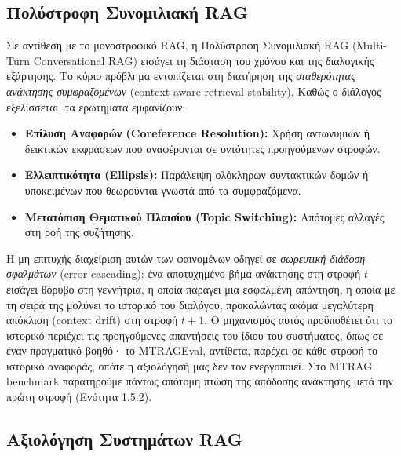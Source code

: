 \subsection{Πολύστροφη Συνομιλιακή RAG}

Σε αντίθεση με το μονοστροφικό RAG, η Πολύστροφη Συνομιλιακή RAG (Multi-Turn Conversational RAG) εισάγει τη διάσταση του χρόνου και της διαλογικής εξάρτησης. Το κύριο πρόβλημα εντοπίζεται στη διατήρηση της \textit{σταθερότητας ανάκτησης συμφραζομένων} (context-aware retrieval stability). Καθώς ο διάλογος εξελίσσεται, τα ερωτήματα εμφανίζουν:
\begin{itemize}
    \item \textbf{Επίλυση Αναφορών (Coreference Resolution):} Χρήση αντωνυμιών ή δεικτικών εκφράσεων που αναφέρονται σε οντότητες προηγούμενων στροφών.
    \item \textbf{Ελλειπτικότητα (Ellipsis):} Παράλειψη ολόκληρων συντακτικών δομών ή υποκειμένων που θεωρούνται γνωστά από τα συμφραζόμενα.
    \item \textbf{Μετατόπιση Θεματικού Πλαισίου (Topic Switching):} Απότομες αλλαγές στη ροή της συζήτησης.
\end{itemize}

Η μη επιτυχής διαχείριση αυτών των φαινομένων οδηγεί σε \textit{σωρευτική διάδοση σφαλμάτων} (error cascading): ένα αποτυχημένο βήμα ανάκτησης στη στροφή $t$ εισάγει θόρυβο στη γεννήτρια, η οποία παράγει μια εσφαλμένη απάντηση, η οποία με τη σειρά της μολύνει το ιστορικό του διαλόγου, προκαλώντας ακόμα μεγαλύτερη απόκλιση (context drift) στη στροφή $t+1$. Ο μηχανισμός αυτός προϋποθέτει ότι το ιστορικό περιέχει τις προηγούμενες απαντήσεις του ίδιου του συστήματος, όπως σε έναν πραγματικό βοηθό· το MTRAGEval, αντίθετα, παρέχει σε κάθε στροφή το ιστορικό αναφοράς, οπότε η αξιολόγησή μας δεν τον ενεργοποιεί. Στο MTRAG benchmark παρατηρούμε πάντως απότομη πτώση της απόδοσης ανάκτησης μετά την πρώτη στροφή (Ενότητα 1.5.2).

\subsection{Αξιολόγηση Συστημάτων RAG}

